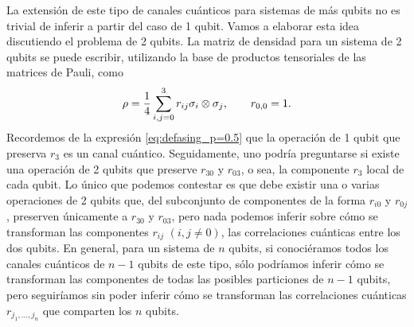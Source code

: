 La extensión de este tipo de canales cuánticos para sistemas de más qubits no es 
trivial de inferir a partir del caso de 1 qubit. 
Vamos a elaborar esta idea discutiendo el problema de 2 qubits.
La matriz de densidad para un sistema de 2 qubits se puede escribir,
utilizando la base de productos tensoriales de las matrices de Pauli, como
\begin{align}\label{eq:rho_2qubits_cap2}
\rho = \frac{1}{4}\sum_{i,j=0}^3r_{ij}\sigma_i\otimes\sigma_j, 
\qquad r_{0,0}=1.
\end{align}
Recordemos de la expresión \eqref{eq:defasing_p=0.5} que la operación de 1 qubit
que preserva $r_3$ es un canal cuántico. Seguidamente, uno podría preguntarse
si existe una operación de 2 qubits que preserve
$r_{30}$ y $r_{03}$, o sea, la componente $r_3$ local de cada qubit. 
Lo único que podemos contestar es que debe existir una o varias operaciones
de 2 qubits que, del subconjunto de componentes de la forma $r_{i0}$ y $r_{0j}$,
preserven únicamente a $r_{30}$ y $r_{03}$, pero nada podemos inferir 
sobre cómo se transforman las componentes $r_{ij}$ $(i,j\ne 0)$, 
las correlaciones cuánticas entre los dos qubits. 
En general, para un sistema de $n$ qubits, si conociéramos todos los canales cuánticos
de $n-1$ qubits de este tipo, sólo podríamos inferir cómo se transforman las componentes 
de todas las posibles particiones de $n-1$ qubits, pero seguiríamos sin poder inferir
cómo se transforman las correlaciones cuánticas $r_{j_1,\ldots,j_n}$ 
que comparten los $n$ qubits.


